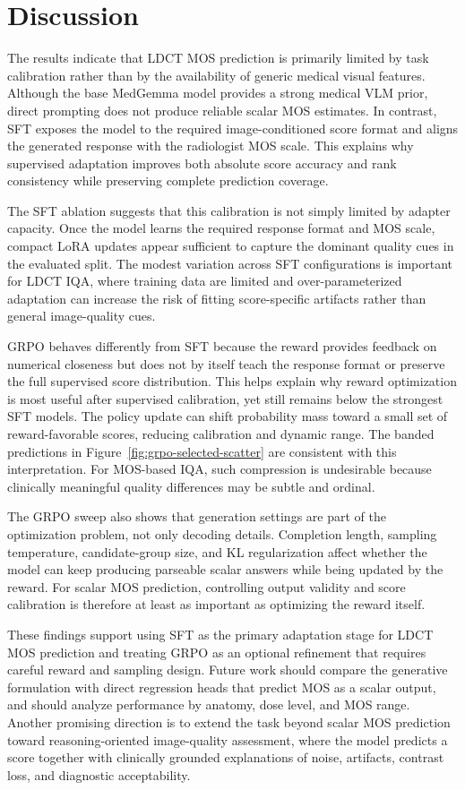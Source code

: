 \chapter{Discussion}
The results indicate that LDCT MOS prediction is primarily limited by task calibration rather than by the availability of generic medical visual features. Although the base MedGemma model provides a strong medical VLM prior, direct prompting does not produce reliable scalar MOS estimates. In contrast, SFT exposes the model to the required image-conditioned score format and aligns the generated response with the radiologist MOS scale. This explains why supervised adaptation improves both absolute score accuracy and rank consistency while preserving complete prediction coverage.

The SFT ablation suggests that this calibration is not simply limited by adapter capacity. Once the model learns the required response format and MOS scale, compact LoRA updates appear sufficient to capture the dominant quality cues in the evaluated split. The modest variation across SFT configurations is important for LDCT IQA, where training data are limited and over-parameterized adaptation can increase the risk of fitting score-specific artifacts rather than general image-quality cues.

GRPO behaves differently from SFT because the reward provides feedback on numerical closeness but does not by itself teach the response format or preserve the full supervised score distribution. This helps explain why reward optimization is most useful after supervised calibration, yet still remains below the strongest SFT models. The policy update can shift probability mass toward a small set of reward-favorable scores, reducing calibration and dynamic range. The banded predictions in Figure~\ref{fig:grpo-selected-scatter} are consistent with this interpretation. For MOS-based IQA, such compression is undesirable because clinically meaningful quality differences may be subtle and ordinal.

The GRPO sweep also shows that generation settings are part of the optimization problem, not only decoding details. Completion length, sampling temperature, candidate-group size, and KL regularization affect whether the model can keep producing parseable scalar answers while being updated by the reward. For scalar MOS prediction, controlling output validity and score calibration is therefore at least as important as optimizing the reward itself.

These findings support using SFT as the primary adaptation stage for LDCT MOS prediction and treating GRPO as an optional refinement that requires careful reward and sampling design. Future work should compare the generative formulation with direct regression heads that predict MOS as a scalar output, and should analyze performance by anatomy, dose level, and MOS range. Another promising direction is to extend the task beyond scalar MOS prediction toward reasoning-oriented image-quality assessment, where the model predicts a score together with clinically grounded explanations of noise, artifacts, contrast loss, and diagnostic acceptability.
